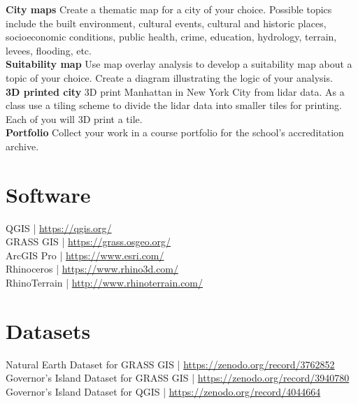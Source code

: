 \documentclass[11pt,article,oneside]{memoir}
\begin{document}
\noindent \textbf{City maps}
Create a thematic map for a city of your choice. 
Possible topics include the built environment, 
cultural events, cultural and historic places, 
socioeconomic conditions, public health, crime, education, 
hydrology, terrain, levees, flooding, etc.\\

\noindent \textbf{Suitability map}
Use map overlay analysis 
to develop a suitability map
about a topic of your choice.
Create a diagram illustrating 
the logic of your analysis.\\

\noindent \textbf{3D printed city}
3D print Manhattan in New York City from lidar data. 
As a class use a tiling scheme 
to divide the lidar data into smaller tiles for printing.
Each of you will 3D print a tile.\\

\noindent \textbf{Portfolio}
Collect your work in a course portfolio 
for the school's accreditation archive.\\

\clearpage

\section{Software}
QGIS | \url{https://qgis.org/}\\
GRASS GIS | \url{https://grass.osgeo.org/}\\
ArcGIS Pro | \url{https://www.esri.com/}\\
Rhinoceros | \url{https://www.rhino3d.com/}\\
RhinoTerrain | \url{http://www.rhinoterrain.com/}\\

\section{Datasets}
Natural Earth Dataset for GRASS GIS | \url{https://zenodo.org/record/3762852}\\
Governor's Island Dataset for GRASS GIS | \url{https://zenodo.org/record/3940780}\\
Governor's Island Dataset for QGIS | \url{https://zenodo.org/record/4044664}\\
\end{document}
